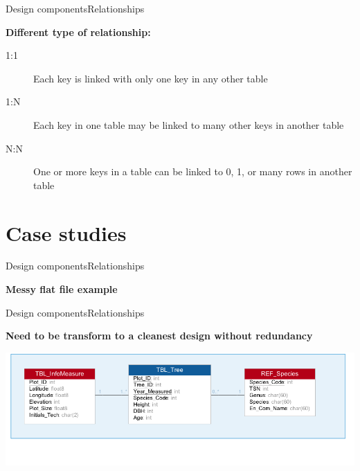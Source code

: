\documentclass{eecslides}
\begin{document}

\begin{frame}{Design components}{Relationships}

\textbf{Different type of relationship:}

		\begin{description}
			\item [1:1] Each key is linked with only one key in any other table
			\item [1:N] Each key in one table may be linked to many other keys in another table
			\item [N:N] One or more keys in a table can be linked to 0, 1, or many rows in another table
		\end{description}

\end{frame}


\section{Case studies}

\begin{frame}{Design components}{Relationships}

\centering
\textbf{Messy flat file example}

\end{frame}


\begin{frame}{Design components}{Relationships}

\textbf{\alert{Need to be transform to a cleanest design without redundancy}}
\vspace{0.2cm}
	\begin{center}
		\includegraphics[width=0.8\paperwidth]{Ex1_pres_30Sept.png}
	\end{center}
\end{frame}
\end{document}
